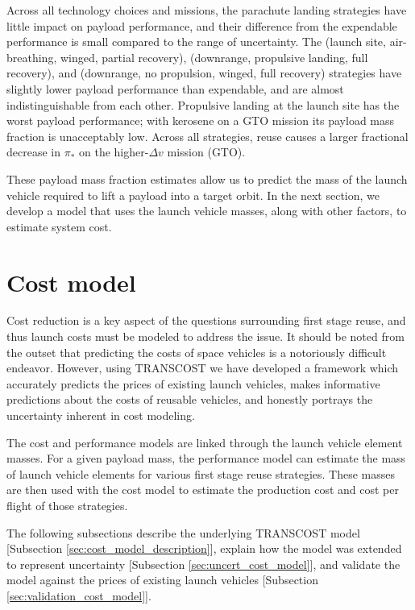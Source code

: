 \documentclass{iaf-iac}
\begin{document}
\begin{multicols}{2}
Across all technology choices and missions, the parachute landing strategies have little impact on payload performance, and their difference from the expendable performance is small compared to the range of uncertainty. The (launch site, air-breathing, winged, partial recovery), (downrange, propulsive landing, full recovery), and (downrange, no propulsion, winged, full recovery)  strategies have slightly lower payload performance than expendable, and are almost indistinguishable from each other.  Propulsive landing at the launch site has the worst payload performance; with kerosene on a GTO mission its payload mass fraction is unacceptably low. Across all strategies, reuse causes a larger fractional decrease in $\pi_*$ on the higher-$\Delta v$ mission (GTO).

These payload mass fraction estimates allow us to predict the mass of the launch vehicle required to lift a payload into a target orbit. In the next section, we develop a model that uses the launch vehicle masses, along with other factors, to estimate system cost.

\section{Cost model}
Cost reduction is a key aspect of the questions surrounding first stage reuse, and thus launch costs must be modeled to address the issue. It should be noted from the outset that predicting the costs of space vehicles is a notoriously difficult endeavor. However, using TRANSCOST \cite{transcost} we have developed a framework which accurately predicts the prices of existing launch vehicles, makes informative predictions about the costs of reusable vehicles, and honestly portrays the uncertainty inherent in cost modeling.   

The cost and performance models are linked through the launch vehicle element masses. For a given payload mass, the performance model can estimate the mass of launch vehicle elements for various first stage reuse strategies. These masses are then used with the cost model to estimate the production cost and cost per flight of those strategies.

The following subsections describe the underlying TRANSCOST model [Subsection \ref{sec:cost_model_description}], explain how the model was extended to represent uncertainty [Subsection \ref{sec:uncert_cost_model}], and validate the model against the prices of existing launch vehicles [Subsection \ref{sec:validation_cost_model}].


\end{multicols}
\end{document}
